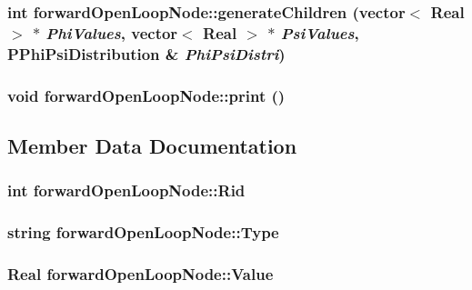 \subsubsection{\setlength{\rightskip}{0pt plus 5cm}int forward\-Open\-Loop\-Node::generate\-Children (vector$<$ Real $>$ $\ast$ {\em Phi\-Values}, vector$<$ Real $>$ $\ast$ {\em Psi\-Values}, {\bf PPhi\-Psi\-Distribution} \& {\em Phi\-Psi\-Distri})\hspace{0.3cm}{\tt  [inline]}}\label{classforwardOpenLoopNode_ff7e83b87596251df49760f161a14975}


\subsubsection{\setlength{\rightskip}{0pt plus 5cm}void forward\-Open\-Loop\-Node::print ()\hspace{0.3cm}{\tt  [inline]}}\label{classforwardOpenLoopNode_ba5e34752e4d5a383df15901ec6ee1f8}




\subsection{Member Data Documentation}
\subsubsection{\setlength{\rightskip}{0pt plus 5cm}int {\bf forward\-Open\-Loop\-Node::Rid}}\label{classforwardOpenLoopNode_44e2e5f80b09e4f07bd529de48cfb161}


\subsubsection{\setlength{\rightskip}{0pt plus 5cm}string {\bf forward\-Open\-Loop\-Node::Type}}\label{classforwardOpenLoopNode_6bbbbf6cb61c6894fe3ea4458fec2c7d}


\subsubsection{\setlength{\rightskip}{0pt plus 5cm}Real {\bf forward\-Open\-Loop\-Node::Value}}\label{classforwardOpenLoopNode_e9b1356b7a30629578e0766c2c7802ec}


